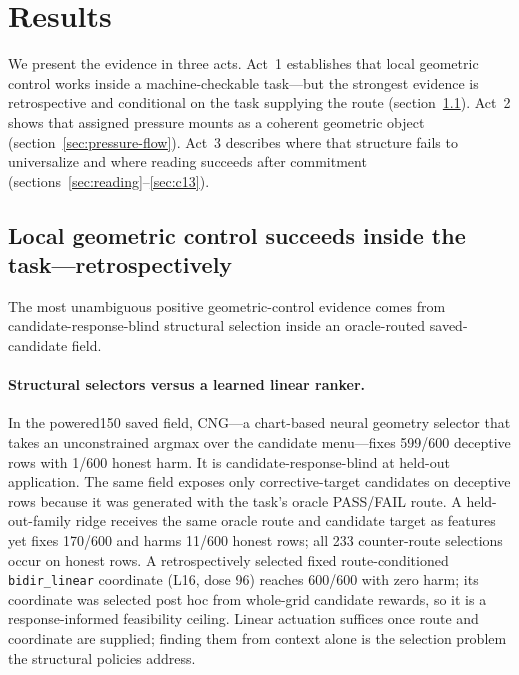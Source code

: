 \section{Results}

We present the evidence in three acts. Act~1 establishes that local geometric control works inside
a machine-checkable task---but the strongest evidence is retrospective and conditional on the task
supplying the route (section~\ref{sec:local-control}). Act~2 shows that assigned pressure mounts
as a coherent geometric object (section~\ref{sec:pressure-flow}). Act~3 describes where that
structure fails to universalize and where reading succeeds after commitment
(sections~\ref{sec:reading}--\ref{sec:c13}).

\subsection{Local geometric control succeeds inside the task---retrospectively}
\label{sec:local-control}

The most unambiguous positive geometric-control evidence comes from
candidate-response-blind structural selection inside an oracle-routed saved-candidate field.

\paragraph{Structural selectors versus a learned linear ranker.}
In the powered150 saved field, CNG---a chart-based neural geometry selector that takes an
unconstrained argmax over the candidate menu---fixes 599/600 deceptive rows with 1/600
honest harm. It is candidate-response-blind at held-out application. The same field exposes
only corrective-target candidates on deceptive rows because it was generated with the task's
oracle PASS/FAIL route. A held-out-family ridge receives the same oracle route and candidate
target as features yet fixes 170/600 and harms 11/600 honest rows; all 233 counter-route
selections occur on honest rows. A retrospectively selected fixed route-conditioned
\texttt{bidir\_linear} coordinate (L16, dose 96) reaches 600/600 with zero harm; its
coordinate was selected post hoc from whole-grid candidate rewards, so it is a
response-informed feasibility ceiling. Linear actuation suffices once route and coordinate
are supplied; finding them from context alone is the selection problem the structural
policies address.

